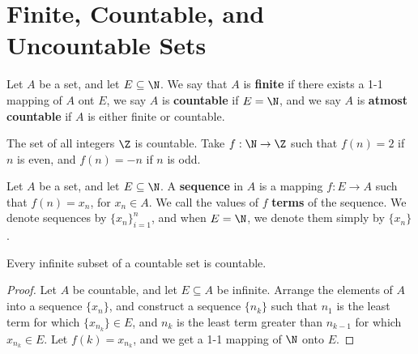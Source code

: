 
\section{Finite, Countable, and Uncountable Sets}

\begin{definition}
    Let $A$ be a set, and let  $E \subseteq \N$. We say that  $A$ is \textbf{finite} if there 
    exists a 1-1 mapping of $A$ ont $E$, we say $A$ is \textbf{countable} if  $E=\N$, and 
    we say  $A$ is \textbf{atmost countable} if $A$ is either finite or countable.
\end{definition}

\begin{example}
    The set of all integers $\Z$ is countable. Take  $f:\N \rightarrow \Z$ such that 
    $f(n)=2$ if  $n$ is even, and  $f(n)=-n$ if  $n$ is odd.
\end{example} 

\begin{definition}
    Let $A$ be a set, and let  $E \subseteq \N$. A \textbf{sequence} in  $A$ is a mapping 
    $f:E \rightarrow A$ such that $f(n)=x_n$, for  $x_n \in A$. We call the values of  $f$
    \textbf{terms} of the sequence. We denote sequences by  $\{x_n\}_{i=1}^{n}$, and 
    when  $E=\N$, we denote them simply by  $\{x_n\}$.
\end{definition}

\begin{theorem}\label{2.1.1} 
    Every infinite subset of a countable set is countable.
\end{theorem}
\begin{proof}
    Let $A$ be countable, and let  $E \subseteq A$ be infinite. Arrange the elements of  $A$ 
    into a sequence $\{x_n\}$, and construct a sequence  $\{n_k\}$ such that  $n_1$ is the 
    least term for which  $\{x_{n_k}\} \in E$, and  $n_k$ is the least term greater than  
    $n_{k-1}$ for which  $x_{n_k} \in E$. Let $f(k)=x_{n_k}$, and we get a 1-1 mapping 
    of $\N$ onto  $E$.
\end{proof}

